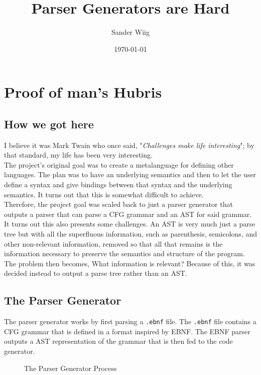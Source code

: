 \documentclass{article}
\title{Parser Generators are Hard}
\author{Sander Wiig}
\date{\today}
\begin{document}
\maketitle

\tableofcontents

\section{Proof of man's Hubris}
\subsection{How we got here}
I believe it was Mark Twain who once said, "\textit{Challenges make life interesting}"; by that standard, my life has been very interesting.\\

The project's original goal was to create a metalanguage for defining other languages.
The plan was to have an underlying semantics and then to let the user define a syntax and give bindings between that syntax and the underlying semantics.
It turns out that this is somewhat difficult to achieve.\\
Therefore, the project goal was scaled back to just a parser generator that outputs a parser that can parse a CFG grammar and an AST for said grammar.\\

It turns out this also presents some challenges. An AST is very much just a parse tree but with all the superfluous information, such as parenthesis, semicolons, and other non-relevant information, removed so that all that remains is the information necessary to preserve the semantics and structure of the program. The problem then becomes, What information is relevant? Because of this, it was decided instead to output a parse tree rather than an AST.


\subsection{The Parser Generator}
The parser generator works by first parsing a \texttt{.ebnf} file. The \texttt{.ebnf} file contains a CFG grammar that is defined in a format inspired by EBNF.
The EBNF parser outputs a AST representation of the grammar that is then fed to the code generator.

\begin{figure}[!h]
    \centering
    \caption{The Parser Generator Process}
    \label{fig:process}
\end{figure}
\end{document}
